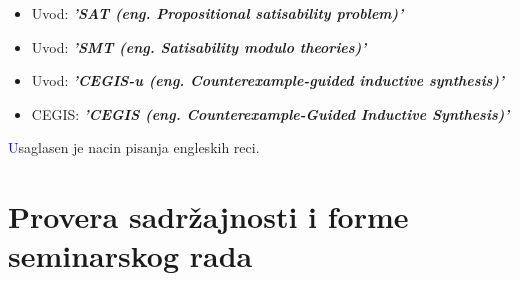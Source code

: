 \documentclass[a4paper]{report}
\newcommand{\odgovor}[1]{\textcolor{blue}{#1}}
\begin{document}
\begin{itemize}
	\item Uvod: \textbf{\textit{'SAT (eng. Propositional satisability problem)'}}
    \item Uvod: \textbf{\textit{'SMT (eng. Satisability modulo theories)'}}
	\item Uvod: \textbf{\textit{'CEGIS-u (eng. Counterexample-guided inductive synthesis)'}}
    \item CEGIS: \textbf{\textit{'CEGIS (eng. Counterexample-Guided Inductive Synthesis)'}}
\end{itemize}
\odgovor Usaglasen je nacin pisanja engleskih reci.


\section{Provera sadržajnosti i forme seminarskog rada}
\end{document}

